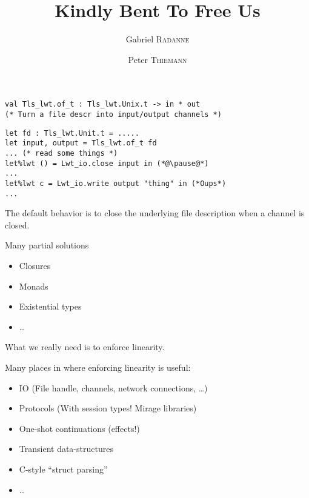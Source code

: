 \documentclass[xcolor=svgnames,11pt]{beamer}
\title{Kindly Bent To Free Us}
\author{Gabriel \textsc{Radanne} \and Peter \textsc{Thiemann}}
\begin{document}
\frame[plain]{\titlepage}

\begin{frame}

\begin{lstlisting}
val Tls_lwt.of_t : Tls_lwt.Unix.t -> in * out
(* Turn a file descr into input/output channels *)
\end{lstlisting}\pause
\begin{lstlisting}
let fd : Tls_lwt.Unit.t = .....
let input, output = Tls_lwt.of_t fd
... (* read some things *)
let%lwt () = Lwt_io.close input in (*@\pause@*)
...
let%lwt c = Lwt_io.write output "thing" in (*Oups*)
...
\end{lstlisting}
  \pause

  The default behavior is to close the underlying file description when a channel is closed.
\end{frame}

\begin{frame}
  Many partial solutions
  \begin{itemize}
  \item Closures
  \item Monads
  \item Existential types
  \item \dots
  \end{itemize}
  \pause

  What we really need is to enforce linearity.
\end{frame}

\begin{frame}
  Many places in \ocaml where enforcing linearity is useful:
  \begin{itemize}
  \item IO (File handle, channels, network connections, \dots)
  \item Protocols (With session types! Mirage libraries)
  \item One-shot continuations (effects!)
  \item Transient data-structures
  \item C-style ``struct parsing''
  \item \dots
  \end{itemize}
\end{frame}
\end{document}
